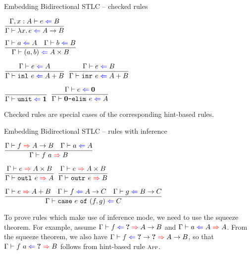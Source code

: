 \documentclass{beamer}
\begin{document}
\begin{frame}{Embedding Bidirectional STLC -- checked rules}

\begin{center}
  $\infrule{\check[\extend{\Gamma}{x}{A}]{e}{B}}{\check{\fun{x}{e}}{\Fun{A}{B}}}$

  \vspace{2em}

  $\infrule{\check{a}{A} \quad \check{b}{B}}{\check{\pair{a}{b}}{\Prod{A}{B}}}$

  \vspace{2em}

  $\infrule{\check{e}{A}}{\check{\inl{e}}{\Sum{A}{B}}}$ \quad
  $\infrule{\check{e}{B}}{\check{\inr{e}}{\Sum{A}{B}}}$

  \vspace{2em}

  $\infrule{}{\check{\unit}{\Unit}}$ \quad
  $\infrule{\check{e}{\Empty}}{\check{\emptyelim{e}}{A}}$
\end{center}

\vspace{1em}

Checked rules are special cases of the corresponding hint-based rules.

\end{frame}

\begin{frame}{Embedding Bidirectional STLC -- rules with inference}

\begin{center}
  $\infrule{\infer{f}{\Fun{A}{B}} \quad \check{a}{A}}{\infer{\app{f}{a}}{B}}$

  \vspace{2em}

  $\infrule{\infer{e}{\Prod{A}{B}}}{\infer{\outl{e}}{A}}$ \quad
  $\infrule{\infer{e}{\Prod{A}{B}}}{\infer{\outr{e}}{B}}$

  \vspace{2em}

  $\infrule{\infer{e}{\Sum{A}{B}} \quad \check{f}{\Fun{A}{C}} \quad \check{g}{\Fun{B}{C}}}{\check{\case{e}{f}{g}}{C}}$
\end{center}

\vspace{1em}

To prove rules which make use of inference mode, we need to use the squeeze theorem. For example, assume $\hinting{f}{\Hole}{\Fun{A}{B}}$ and $\hinting{a}{A}{A}$. From the squeeze theorem, we also have $\hinting{f}{\Fun{\Hole}{\Hole}}{\Fun{A}{B}}$, so that $\hinting{\app{f}{a}}{\Hole}{B}$ follows from hint-based rule $\textsc{\footnotesize{App}}$.

\end{frame}
\end{document}
